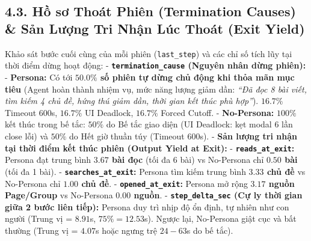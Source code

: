 \documentclass[11pt]{article}
\begin{document}
    \begin{center}
    \end{center}
    { \hspace*{\fill} \\}
    
    \begin{center}
    \end{center}
    { \hspace*{\fill} \\}
    
    \subsection{4.3. Hồ sơ Thoát Phiên (Termination Causes) \& Sản Lượng Tri
Nhận Lúc Thoát (Exit
Yield)}\label{hux1ed3-sux1a1-thouxe1t-phiuxean-termination-causes-sux1ea3n-lux1b0ux1ee3ng-tri-nhux1eadn-luxfac-thouxe1t-exit-yield}

Khảo sát bước cuối cùng của mỗi phiên (\texttt{last\_step}) và các chỉ
số tích lũy tại thời điểm dừng hoạt động: -
\textbf{\texttt{termination\_cause} (Nguyên nhân dừng phiên):} -
\textbf{Persona:} Có tới \textbf{\(50.0\%\) số phiên tự dừng chủ động
khi thỏa mãn mục tiêu} (Agent hoàn thành nhiệm vụ, mức năng lượng giảm
dần: \emph{``Đã đọc 8 bài viết, tìm kiếm 4 chủ đề, hứng thú giảm dần,
thời gian kết thúc phù hợp''}). \(16.7\%\) Timeout 600s, \(16.7\%\) UI
Deadlock, \(16.7\%\) Forced Cutoff. - \textbf{No-Persona:} \(100\%\) kết
thúc trong bế tắc: \(50\%\) do Bế tắc giao diện (UI Deadlock: kẹt modal
6 lần close lỗi) và \(50\%\) do Hết giờ thuần túy (Timeout 600s). -
\textbf{Sản lượng tri nhận tại thời điểm kết thúc phiên (Output Yield at
Exit):} - \textbf{\texttt{reads\_at\_exit}:} Persona đạt trung bình
\textbf{\(3.67\) bài đọc} (tối đa 6 bài) vs No-Persona chỉ
\textbf{\(0.50\) bài} (tối đa 1 bài). -
\textbf{\texttt{searches\_at\_exit}:} Persona tìm kiếm trung bình
\textbf{\(3.33\) chủ đề} vs No-Persona chỉ \textbf{\(1.00\) chủ đề}. -
\textbf{\texttt{opened\_at\_exit}:} Persona mở rộng \textbf{\(3.17\)
nguồn Page/Group} vs No-Persona \textbf{\(0.00\) nguồn}. -
\textbf{\texttt{step\_delta\_sec} (Cự ly thời gian giữa 2 bước liên
tiếp):} Persona duy trì nhịp độ ổn định, tự nhiên như con người (Trung
vị = \(8.91\)s, \(75\% = 12.53\)s). Ngược lại, No-Persona giật cục và
bất thường (Trung vị = \(4.07\)s hoặc ngưng trệ \(24 - 63\)s do bế tắc).
\end{document}

